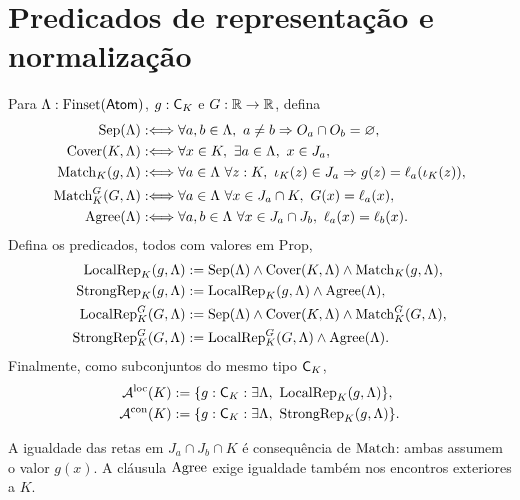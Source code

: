 \section{Predicados de representação e normalização}
\label{normalizacao:sec:normalization}

\begin{definicao}\label{map:normalizacao:3.1}\label{normalizacao:def:contracts}
Para $\Lambda:\operatorname{Finset}(\mathsf{Atom})$, $g:\mathsf C_K$ e $G:\mathbb R\to\mathbb R$, defina
\begin{align*}
 \operatorname{Sep}(\Lambda)&:\Longleftrightarrow
  \forall a,b\in\Lambda,\ a\ne b\Rightarrow O_a\cap O_b=\varnothing,\\
 \operatorname{Cover}(K,\Lambda)&:\Longleftrightarrow
  \forall x\in K,\ \exists a\in\Lambda,\ x\in J_a,\\
 \operatorname{Match}_K(g,\Lambda)&:\Longleftrightarrow
  \forall a\in\Lambda\ \forall z:K,\
       \iota_K(z)\in J_a\Rightarrow g(z)=\ell_a(\iota_K(z)),\\
 \operatorname{Match}^G_K(G,\Lambda)&:\Longleftrightarrow
  \forall a\in\Lambda\ \forall x\in J_a\cap K,\ G(x)=\ell_a(x),\\
 \operatorname{Agree}(\Lambda)&:\Longleftrightarrow
  \forall a,b\in\Lambda\ \forall x\in J_a\cap J_b,\
       \ell_a(x)=\ell_b(x).
\end{align*}
Defina os predicados, todos com valores em $\mathrm{Prop}$,
\begin{align*}
 \operatorname{LocalRep}_K(g,\Lambda)&:=\operatorname{Sep}(\Lambda)\land\operatorname{Cover}(K,\Lambda)
                         \land\operatorname{Match}_K(g,\Lambda),\\
 \operatorname{StrongRep}_K(g,\Lambda)&:=\operatorname{LocalRep}_K(g,\Lambda)\land\operatorname{Agree}(\Lambda),\\
 \operatorname{LocalRep}^G_K(G,\Lambda)&:=\operatorname{Sep}(\Lambda)\land\operatorname{Cover}(K,\Lambda)
                         \land\operatorname{Match}^G_K(G,\Lambda),\\
 \operatorname{StrongRep}^G_K(G,\Lambda)&:=\operatorname{LocalRep}^G_K(G,\Lambda)\land\operatorname{Agree}(\Lambda).
\end{align*}
Finalmente, como subconjuntos do mesmo tipo $\mathsf C_K$,
\begin{align*}
 \mathcal A^{\mathrm{loc}}(K)&:=\{g:\mathsf C_K:\exists\Lambda,\ \operatorname{LocalRep}_K(g,\Lambda)\},\\
 \mathcal A^{\mathrm{con}}(K)&:=\{g:\mathsf C_K:\exists\Lambda,\ \operatorname{StrongRep}_K(g,\Lambda)\}.
\end{align*}
\end{definicao}

A igualdade das retas em $J_a\cap J_b\cap K$ é consequência de
$\operatorname{Match}$: ambas assumem o valor $g(x)$. A cláusula $\operatorname{Agree}$ exige
igualdade também nos encontros exteriores a $K$.

